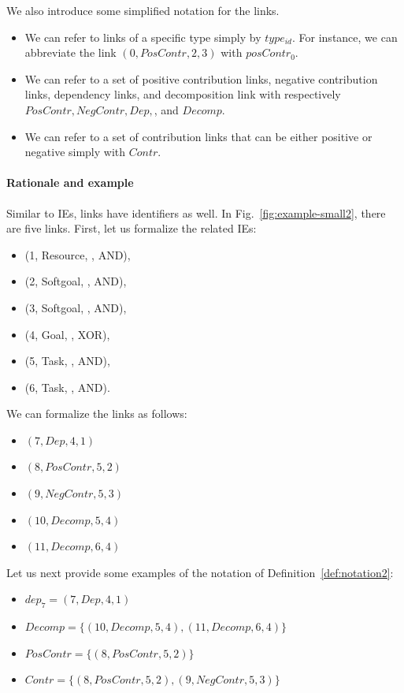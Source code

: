 We also introduce some simplified notation for the links.

\begin{definition}[Notation]
\label{def:notation2}
\begin{itemize}
\item
We can refer to links of a specific type simply by $type_{id}$. For instance, we can abbreviate the link $(0,PosContr,2,3)$ with $posContr_0$. 
\item 
We can refer to a set of positive contribution links, negative contribution links, dependency links, and decomposition link with respectively $PosContr, NegContr, Dep,$, and $Decomp$. 
\item
We can refer to a set of contribution links that can be either positive or negative simply with $Contr$.
\end{itemize}
\end{definition}

\paragraph{Rationale and example} Similar to IEs, links have identifiers as well. In Fig.~\ref{fig:example-small2}, there are five links. First, let us formalize the related IEs:
\begin{itemize}
\item (1, Resource, , AND),
\item (2, Softgoal, , AND),
\item (3, Softgoal, , AND),
\item (4, Goal, , XOR),
\item (5, Task, , AND),
\item (6, Task, , AND).
\end{itemize}

We can formalize the links as follows:
\begin{itemize}
\item $(7, Dep, 4, 1)$
\item $(8, PosContr, 5, 2)$
\item $(9, NegContr, 5, 3)$
\item $(10, Decomp, 5, 4)$
\item $(11, Decomp, 6, 4)$
\end{itemize}

Let us next provide some examples of the notation of Definition~\ref{def:notation2}:
\begin{itemize}
\item $dep_7 = (7, Dep, 4, 1)$
\item $Decomp = \{(10, Decomp, 5, 4), (11, Decomp, 6, 4)\}$
\item $PosContr = \{(8, PosContr, 5, 2)\}$
\item $Contr = \{(8, PosContr, 5, 2), (9, NegContr, 5, 3)\}$
\end{itemize}

